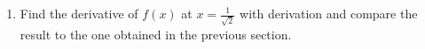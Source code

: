 \begin{enumerate}
\begin{enumerate}[label=\roman*.]
							\item Find the derivative of $f\left( x \right)$ at $x=\frac{1}{\sqrt{2}}$ with derivation and compare the result to the one obtained in the previous section.
								\if{}\fi
		\end{enumerate}
\end{enumerate}
